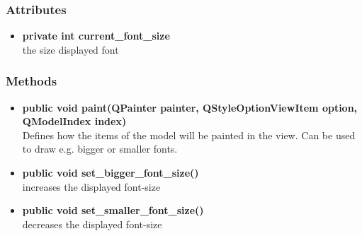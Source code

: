 \subsubsection{Attributes}
\begin{itemize}
  \item \textbf{private int current\_font\_size}\\
  the size displayed font
\end{itemize}
\subsubsection{Methods}
\begin{itemize}
  \item \textbf{public void paint(QPainter painter, QStyleOptionViewItem option,
  QModelIndex index)}\\
  Defines how the items of the model will be painted in the view. Can be used to draw e.g. bigger or smaller fonts.
  \item \textbf{public void set\_bigger\_font\_size()}\\
  increases the displayed font-size
  \item \textbf{public void set\_smaller\_font\_size()}\\
  decreases the displayed font-size
\end{itemize}

\newpage
